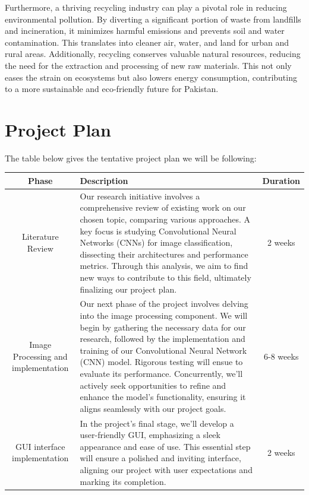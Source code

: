 \documentclass{article}
\begin{document}
Furthermore, a thriving recycling industry can play a pivotal role in reducing environmental pollution. By diverting a significant portion of waste from landfills and incineration, it minimizes harmful emissions and prevents soil and water contamination. This translates into cleaner air, water, and land for urban and rural areas. Additionally, recycling conserves valuable natural resources, reducing the need for the extraction and processing of new raw materials. This not only eases the strain on ecosystems but also lowers energy consumption, contributing to a more sustainable and eco-friendly future for Pakistan.
\section{Project Plan}
The table below gives the tentative project plan we will be following:
\begin{center}
\begin{table}[H]
\centering
\begin{longtable}{|c|p{}|c|}
\hline
Phase & Description & Duration \\
\hline
Literature Review & Our research initiative involves a comprehensive review of existing work on our chosen topic, comparing various approaches. A key focus is studying Convolutional Neural Networks (CNNs) for image classification, dissecting their architectures and performance metrics. Through this analysis, we aim to find new ways to contribute to this field, ultimately finalizing our project plan. & 2 weeks \\
\endfirsthead
\hline
Image Processing and implementation & Our next phase of the project involves delving into the image processing component. We will begin by gathering the necessary data for our research, followed by the implementation and training of our Convolutional Neural Network (CNN) model. Rigorous testing will ensue to evaluate its performance. Concurrently, we'll actively seek opportunities to refine and enhance the model's functionality, ensuring it aligns seamlessly with our project goals. & 6-8 weeks \\
\hline
GUI interface implementation & In the project's final stage, we'll develop a user-friendly GUI, emphasizing a sleek appearance and ease of use. This essential step will ensure a polished and inviting interface, aligning our project with user expectations and marking its completion. & 2 weeks \\\hline
\end{longtable}
\end{table}
\end{center}
\end{document}
